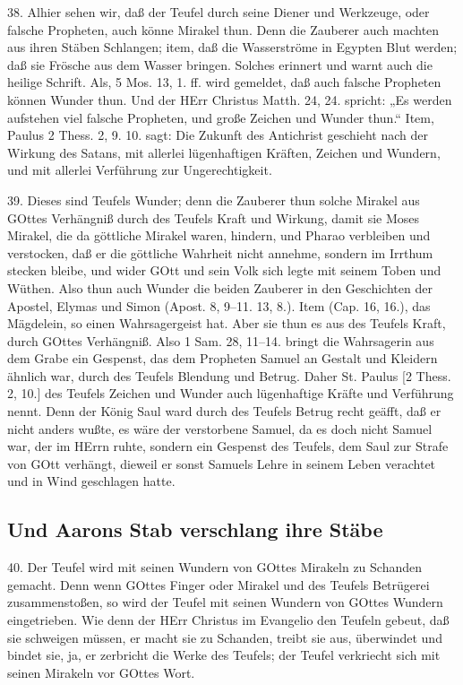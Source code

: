 38. Alhier sehen wir, daß der Teufel durch seine Diener und Werkzeuge, oder falsche Propheten, auch könne Mirakel thun. Denn die Zauberer auch machten aus ihren Stäben Schlangen; item, daß die Wasserströme in Egypten Blut werden; daß sie Frösche aus dem Wasser bringen. Solches erinnert und warnt auch die heilige Schrift. Als, 5 Mos. 13, 1. ff. wird gemeldet, daß auch falsche Propheten können Wunder thun. Und der HErr Christus Matth. 24, 24. spricht: „Es werden aufstehen viel falsche Propheten, und große Zeichen und Wunder thun.“ Item, Paulus 2 Thess. 2, 9. 10. sagt: Die Zukunft des Antichrist geschieht nach der Wirkung des Satans, mit allerlei lügenhaftigen Kräften, Zeichen und Wundern, und mit allerlei Verführung zur Ungerechtigkeit.

39. Dieses sind Teufels Wunder; denn die Zauberer thun solche Mirakel aus GOttes Verhängniß durch des Teufels Kraft und Wirkung, damit sie Moses Mirakel, die da göttliche Mirakel waren, hindern, und Pharao verbleiben und verstocken, daß er die göttliche Wahrheit nicht annehme, sondern im Irrthum stecken bleibe, und wider GOtt und sein Volk sich legte mit seinem Toben und Wüthen. Also thun auch Wunder die beiden Zauberer in den Geschichten der Apostel, Elymas und Simon (Apost. 8, 9–11. 13, 8.). Item (Cap. 16, 16.), das Mägdelein, so einen Wahrsagergeist hat. Aber sie thun es aus des Teufels Kraft, durch GOttes Verhängniß. Also 1 Sam. 28, 11–14. bringt die Wahrsagerin aus dem Grabe ein Gespenst, das dem Propheten Samuel an Gestalt und Kleidern ähnlich war, durch des Teufels Blendung und Betrug. Daher St. Paulus [2 Thess. 2, 10.] des Teufels Zeichen und Wunder auch lügenhaftige Kräfte und Verführung nennt. Denn der König Saul ward durch des Teufels Betrug recht geäfft, daß er nicht anders wußte, es wäre der verstorbene Samuel, da es doch nicht Samuel war, der im HErrn ruhte, sondern ein Gespenst des Teufels, dem Saul zur Strafe von GOtt verhängt, dieweil er sonst Samuels Lehre in seinem Leben verachtet und in Wind geschlagen hatte.

\subsection{Und Aarons Stab verschlang ihre Stäbe}

40. Der Teufel wird mit seinen Wundern von GOttes Mirakeln zu Schanden gemacht. Denn wenn GOttes Finger oder Mirakel und des Teufels Betrügerei zusammenstoßen, so wird der Teufel mit seinen Wundern von GOttes Wundern eingetrieben. Wie denn der HErr Christus im Evangelio den Teufeln gebeut, daß sie schweigen müssen, er macht sie zu Schanden, treibt sie aus, überwindet und bindet sie, ja, er zerbricht die Werke des Teufels; der Teufel verkriecht sich mit seinen Mirakeln vor GOttes Wort.

